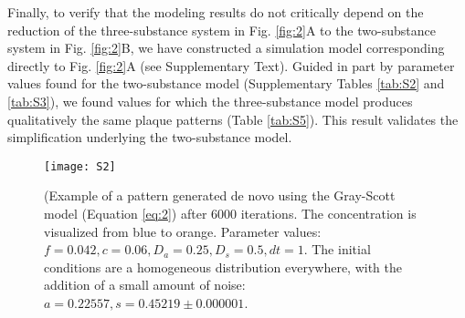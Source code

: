 Finally, to verify that the modeling results do not critically depend on the reduction of the three-substance system in Fig. \ref{fig:2}A to the two-substance system in Fig. \ref{fig:2}B, we have constructed a simulation model corresponding directly to Fig. \ref{fig:2}A (see Supplementary Text). Guided in part by parameter values found for the two-substance model (Supplementary Tables \ref{tab:S2} and \ref{tab:S3}), we found values for which the three-substance model produces qualitatively the same plaque patterns (Table \ref{tab:S5}). This result validates the simplification underlying the two-substance model.

\begin{figure}[!htb]
  \centering
  \texttt{[image: S2]}
  \caption{(Example of a pattern generated de novo using the Gray-Scott model (Equation \ref{eq:2}) after 6000 iterations. The concentration is visualized from blue to orange. Parameter values: $f=0.042, c=0.06, D_a=0.25, D_s=0.5, dt=1$. The initial conditions are a homogeneous distribution everywhere, with the addition of a small amount of noise: $a=0.22557, s=0.45219±0.000001$.}
  \label{fig:S2}
\end{figure}

\newpage

